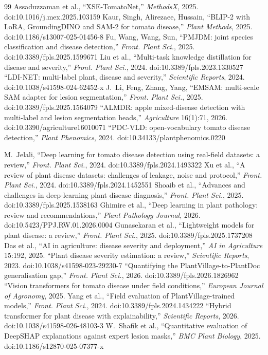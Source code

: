 \begin{thebibliography}{99}
 Assaduzzaman et al., ``XSE-TomatoNet,'' \emph{MethodsX}, 2025. doi:10.1016/j.mex.2025.103159
 Kaur, Singh, Alirezaee, Hussain, ``BLIP-2 with LoRA, GroundingDINO and SAM-2 for tomato disease,'' \emph{Plant Methods}, 2025. doi:10.1186/s13007-025-01456-8
 Fu, Wang, Wang, Sun, ``PMJDM: joint species classification and disease detection,'' \emph{Front. Plant Sci.}, 2025. doi:10.3389/fpls.2025.1599671
 Liu et al., ``Multi-task knowledge distillation for disease and severity,'' \emph{Front. Plant Sci.}, 2024. doi:10.3389/fpls.2023.1330527
 ``LDI-NET: multi-label plant, disease and severity,'' \emph{Scientific Reports}, 2024. doi:10.1038/s41598-024-62452-x
 J.~Li, Feng, Zhang, Yang, ``EMSAM: multi-scale SAM adapter for lesion segmentation,'' \emph{Front. Plant Sci.}, 2025. doi:10.3389/fpls.2025.1564079
 ``ALMDR: apple mixed-disease detection with multi-label and lesion segmentation heads,'' \emph{Agriculture} 16(1):71, 2026. doi:10.3390/agriculture16010071
 ``PDC-VLD: open-vocabulary tomato disease detection,'' \emph{Plant Phenomics}, 2024. doi:10.34133/plantphenomics.0220

 M.~Jelali, ``Deep learning for tomato disease detection using real-field datasets: a review,'' \emph{Front. Plant Sci.}, 2024. doi:10.3389/fpls.2024.1493322
 Xu et al., ``A review of plant disease datasets: challenges of leakage, noise and protocol,'' \emph{Front. Plant Sci.}, 2024. doi:10.3389/fpls.2024.1452551
 Shoaib et al., ``Advances and challenges in deep-learning plant disease diagnosis,'' \emph{Front. Plant Sci.}, 2025. doi:10.3389/fpls.2025.1538163
 Ghimire et al., ``Deep learning in plant pathology: review and recommendations,'' \emph{Plant Pathology Journal}, 2026. doi:10.5423/PPJ.RW.01.2026.0004
 Gunasekaran et al., ``Lightweight models for plant disease: a review,'' \emph{Front. Plant Sci.}, 2025. doi:10.3389/fpls.2025.1737208
 Das et al., ``AI in agriculture: disease severity and deployment,'' \emph{AI in Agriculture} 15:192, 2025.
 ``Plant disease severity estimation: a review,'' \emph{Scientific Reports}, 2023. doi:10.1038/s41598-023-29230-7
 ``Quantifying the PlantVillage-to-PlantDoc generalisation gap,'' \emph{Front. Plant Sci.}, 2026. doi:10.3389/fpls.2026.1826962
 ``Vision transformers for tomato disease under field conditions,'' \emph{European Journal of Agronomy}, 2025.
 Yang et al., ``Field evaluation of PlantVillage-trained models,'' \emph{Front. Plant Sci.}, 2024. doi:10.3389/fpls.2024.1434222
 ``Hybrid transformer for plant disease with explainability,'' \emph{Scientific Reports}, 2026. doi:10.1038/s41598-026-48103-3
 W.~Shafik et al., ``Quantitative evaluation of DeepSHAP explanations against expert lesion masks,'' \emph{BMC Plant Biology}, 2025. doi:10.1186/s12870-025-07377-x


\end{thebibliography}
